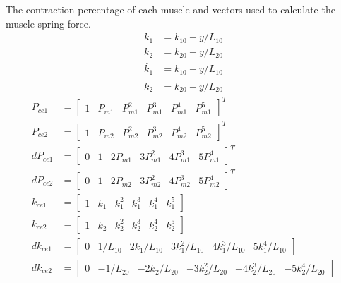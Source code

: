 \documentclass[11pt,a4paper]{article}
\begin{document}
\begin{appendices}
The contraction percentage of each muscle and vectors used to calculate the muscle spring force.\newline
\begin{align}
    k_{1} &= k_{10} + y / L_{10}\\
    k_{2} &= k_{20} + y / L_{20}\\
    \dot{k_{1}} &= k_{10} + \dot{y} / L_{10}\\
    \dot{k_{2}} &= k_{20} + \dot{y} / L_{20}
\end{align}
\begin{align}
  P_{ce1} &=
  \begin{bmatrix}
    1 & P_{m1} & P_{m1}^2 &  P_{m1}^3 &  P_{m1}^4 &  P_{m1}^5
  \end{bmatrix}^T\\
  P_{ce2} &=
  \begin{bmatrix}
    1 & P_{m2} & P_{m2}^2 & P_{m2}^3 & P_{m2}^4 & P_{m2}^5
  \end{bmatrix}^T\\
  dP_{ce1} &=
  \begin{bmatrix}
    0 & 1 & 2 P_{m1} & 3 P_{m1}^2 & 4 P_{m1}^3 & 5 P_{m1}^4
  \end{bmatrix}^T\\
  dP_{ce2} &=
  \begin{bmatrix}
    0 & 1 & 2 P_{m2} & 3 P_{m2}^2 & 4 P_{m2}^3 &  5 P_{m2}^4
  \end{bmatrix}^T\\
  k_{ce1} &=
  \begin{bmatrix}
    1 & k_{1} & k_{1}^2 & k_{1}^3 & k_{1}^4 & k_{1}^5
  \end{bmatrix}\\
  k_{ce2} &=
  \begin{bmatrix}
    1 & k_{2} & k_{2}^2 & k_{2}^3 & k_{2}^4 & k_{2}^5
  \end{bmatrix}\\
  dk_{ce1} &=
  \begin{bmatrix}
    0 & 1 / L_{10} & 2 k_{1} / L_{10} & 3 k_{1}^2 / L_{10} & 4 k_{1}^3 / L_{10} &  5 k_{1}^4 / L_{10}
  \end{bmatrix}\\
  dk_{ce2} &=
  \begin{bmatrix}
    0 & -1 / L_{20} &  -2 k_{2} / L_{20} & -3 k_{2}^2 / L_{20} &  -4 k_{2}^3 / L_{20} &  -5 k_{2}^4 / L_{20}
  \end{bmatrix}
\end{align}


\end{appendices}
\end{document}
